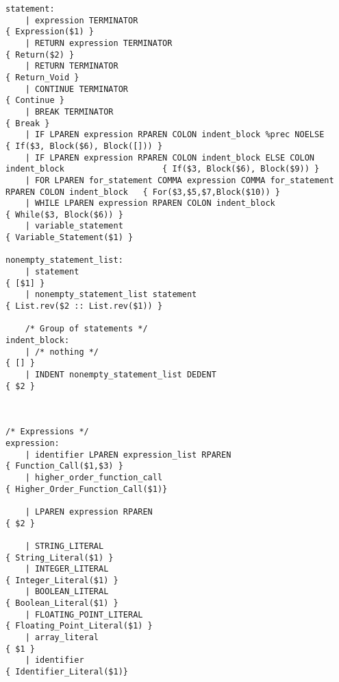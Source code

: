 \begin{verbatim}
statement:
    | expression TERMINATOR                                             { Expression($1) } 
    | RETURN expression TERMINATOR                                      { Return($2) }
    | RETURN TERMINATOR                                                 { Return_Void }
    | CONTINUE TERMINATOR                                                                       { Continue }
    | BREAK TERMINATOR                                                                          { Break }
    | IF LPAREN expression RPAREN COLON indent_block %prec NOELSE                               { If($3, Block($6), Block([])) }   
    | IF LPAREN expression RPAREN COLON indent_block ELSE COLON indent_block                    { If($3, Block($6), Block($9)) }
    | FOR LPAREN for_statement COMMA expression COMMA for_statement RPAREN COLON indent_block   { For($3,$5,$7,Block($10)) }
    | WHILE LPAREN expression RPAREN COLON indent_block                                         { While($3, Block($6)) }
    | variable_statement                                                                        { Variable_Statement($1) } 

nonempty_statement_list:
    | statement                                                         { [$1] }
    | nonempty_statement_list statement                                 { List.rev($2 :: List.rev($1)) }

    /* Group of statements */
indent_block:
    | /* nothing */                                                     { [] }
    | INDENT nonempty_statement_list DEDENT                             { $2 }



/* Expressions */
expression:
    | identifier LPAREN expression_list RPAREN                          { Function_Call($1,$3) }
    | higher_order_function_call                                        { Higher_Order_Function_Call($1)}

    | LPAREN expression RPAREN                                          { $2 }

    | STRING_LITERAL                                                    { String_Literal($1) }
    | INTEGER_LITERAL                                                   { Integer_Literal($1) }
    | BOOLEAN_LITERAL                                                   { Boolean_Literal($1) }
    | FLOATING_POINT_LITERAL                                            { Floating_Point_Literal($1) }
    | array_literal                                                     { $1 }
    | identifier                                                        { Identifier_Literal($1)}


\end{verbatim}
